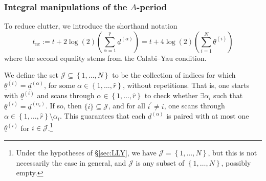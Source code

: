 \documentclass[12pt,a4paper,oneside]{amsart}
\numberwithin{equation}{section}
\theoremstyle{definition}
\theoremstyle{remark}
\newcommand{\tnc}{t_{\mathrm{nc}}}
\begin{document}
\subsubsection{Integral manipulations of the \texorpdfstring{$A$}{A}-period}
\label{subsec:manipulations}
To reduce clutter, we introduce the shorthand notation
\begin{equation}
\label{eq:tncshift}
	\tnc := t + 2 \log (2) \left( \sum_{\alpha=1}^{\hat{r}} \underline{d}^{(\alpha)} \right) = t + 4\log (2) \left( \sum_{i=1}^{N} \underline{\theta}^{(i)} \right)
\end{equation}
where the second equality stems from the Calabi--Yau condition.\par
We define the set $\mathcal{J} \subseteq \left\{ 1, \dots, N \right\}$ to be the collection of indices for which $\underline{\theta}^{(i)}= \underline{d}^{(\alpha)}$, for some $\alpha \in \left\{1, \dots, \hat{r} \right\}$, without repetitions. That is, one starts with $\underline{\theta}^{(i)}$ and scans through $\alpha \in \left\{1, \dots, \hat{r} \right\}$ to check whether $\exists \alpha_i$ such that $\underline{\theta}^{(i)}= \underline{d}^{(\alpha_i)}$. If so, then $\{ i\} \subseteq \mathcal{J}$, and for all $i^{\prime} \ne i$, one scans through $\alpha \in \left\{1, \dots, \hat{r} \right\} \setminus \alpha_i$. This guarantees that each $\underline{d}^{(\alpha)}$ is paired with at most one $\underline{\theta}^{(i)}$ for $i \in \mathcal{J}$.\footnote{Under the hypotheses of \S\ref{sec:LLY}, we have $\mathcal{J}=\left\{ 1, \dots, N \right\}$, but this is not necessarily the case in general, and $\mathcal{J}$ is any subset of $\left\{ 1, \dots, N \right\}$, possibly empty.}\par
\end{document}
